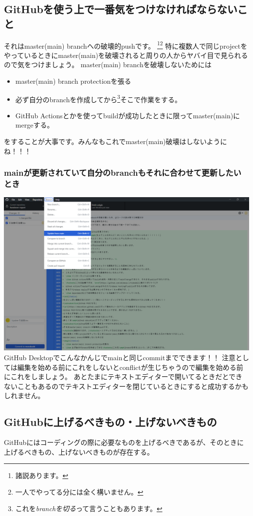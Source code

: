 \documentclass[a4paper]{ltjsreport}
\begin{document}
\subsection{GitHubを使う上で一番気をつけなければならないこと}
それはmaster(main) branchへの破壊的pushです。
\footnote{諸説あります。}\footnote{一人でやってる分には全く構いません。}
特に複数人で同じprojectをやっているときにmaster(main)を破壊されると周りの人からヤバイ目で見られるので気をつけましょう。
master(main) branchを破壊しないためには
\begin{itemize}
  \item master(main) branch protectionを張る
  \item 必ず自分のbranchを作成してから\footnote{これを\emph{branchを切る}って言うこともあります。}そこで作業をする。
  \item GitHub Actionsとかを使ってbuildが成功したときに限ってmaster(main)にmergeする。
\end{itemize}
をすることが大事です。みんなもこれでmaster(main)破壊はしないようにね！！！
\subsubsection{mainが更新されていて自分のbranchもそれに合わせて更新したいとき}
\includegraphics[width=15cm]{assets/update-branch.png}\\
GitHub Desktopでこんなかんじでmainと同じcommitまでできます！！
注意としては編集を始める前にこれをしないとconflictが生じちゃうので編集を始める前にこれをしましょう。
あとたまにテキストエディターで開いてるときだとできないこともあるのでテキストエディターを閉じているときにすると成功するかもしれません。
\subsection{GitHubに上げるべきもの・上げないべきもの}
GitHubにはコーディングの際に必要なものを上げるべきであるが、そのときに上げるべきもの、上げないべきものが存在する。
\end{document}
